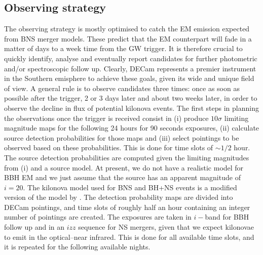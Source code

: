 \subsection{Observing strategy}
The observing strategy is mostly optimised to catch the EM emission expected from BNS merger models. These predict that the EM counterpart will fade in a matter of days to a week time from the GW trigger. It is therefore crucial to quickly identify, analyse and eventually report candidates for further photometric and/or spectroscopic follow up. Clearly, DECam represents a premier instrument in the Southern emisphere to achieve these goals, given its wide and unique field of view. A general rule is to observe candidates three times: once as soon as possible after the trigger, 2 or 3 days later and about two weeks later, in order to observe the decline in flux of potential kilonova events. The first steps in planning the observations once the trigger is received consist in (i) produce $10\sigma$ limiting magnitude maps for the following 24 hours for 90 seconds exposures, (ii) calculate source detection probabilities for those maps and (iii) select pointings to be observed based on these probabilities. This is done for time slots of $\sim 1/2$ hour. The source detection probabilities are computed given the limiting magnitudes from (i) and a source model. At present, we do not have a realistic model for BBH EM and we just assume that the source has an apparent magnitude of $i=20$. The kilonova model used for BNS and BH+NS events is a modified version of the model by \citet{barneskasen}. The detection probability maps are divided into DECam pointings, and time slots of roughly half an hour containing an integer number of pointings are created. The exposures are taken in $i-$band for BBH follow up and in an $izz$ sequence for NS mergers, given that we expect kilonovae to emit in the optical--near infrared. This is done for all available time slots, and it is repeated for the following available nights.



